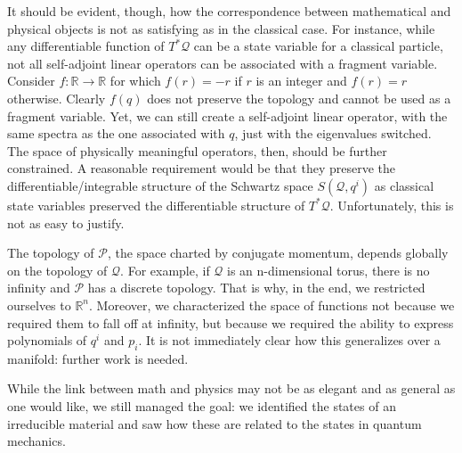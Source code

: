 \documentclass[smallextended]{svjour3}
\numberwithin{equation}{section}
\theoremstyle{definition}
\begin{document}
It should be evident, though, how the correspondence between mathematical and physical objects is not as satisfying as in the classical case. For instance, while any differentiable function of $T^*\mathcal{Q}$ can be a state variable for a classical particle, not all self-adjoint linear operators can be associated with a fragment variable. Consider $f: \mathbb{R} \rightarrow \mathbb{R}$ for which $f(r) = -r$ if $r$ is an integer and $f(r) = r$ otherwise. Clearly $f(q)$ does not preserve the topology and cannot be used as a fragment variable. Yet, we can still create a self-adjoint linear operator, with the same spectra as the one associated with $q$, just with the eigenvalues switched. The space of physically meaningful operators, then, should be further constrained. A reasonable requirement would be that they preserve the differentiable/integrable structure of the Schwartz space $S(\mathcal{Q}, q^i)$ as classical state variables preserved the differentiable structure of $T^*\mathcal{Q}$. Unfortunately, this is not as easy to justify.

The topology of $\mathcal{P}$, the space charted by conjugate momentum, depends globally on the topology of $\mathcal{Q}$. For example, if $\mathcal{Q}$ is an n-dimensional torus, there is no infinity and $\mathcal{P}$ has a discrete topology. That is why, in the end, we restricted ourselves to $\mathbb{R}^n$. Moreover, we characterized the space of functions not because we required them to fall off at infinity, but because we required the ability to express polynomials of $q^i$ and $p_i$. It is not immediately clear how this generalizes over a manifold: further work is needed.

While the link between math and physics may not be as elegant and as general as one would like, we still managed the goal: we identified the states of an irreducible material and saw how these are related to the states in quantum mechanics.


\end{document}
